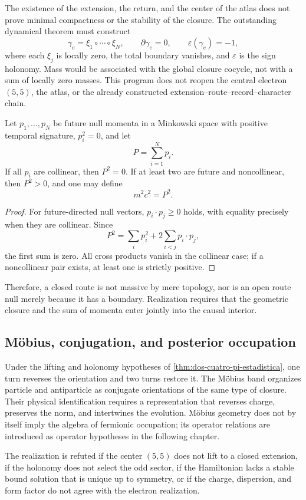 The existence of the extension, the return, and the center of the atlas does not prove
minimal compactness or the stability of the closure. The outstanding dynamical
theorem must construct
\[
 \gamma_e=\xi_1\circ\cdots\circ\xi_N,
 \qquad
 \partial\gamma_e=0,
 \qquad
 \varepsilon(\gamma_e)=-1,
\]
where each \(\xi_j\) is locally zero, the total boundary vanishes, and
\(\varepsilon\) is the sign holonomy. Mass would be associated with the global
closure cocycle, not with a sum of locally zero masses. This program does not
reopen the central electron \((5,5)\), the atlas, or the already constructed
extension--route--record--character chain.

\begin{proposition}
\label{prop:cierre-nulos-interior-causal}
Let \(p_1,\ldots,p_N\) be future null momenta in a Minkowski space with
positive temporal signature, \(p_i^2=0\), and let
\[
 P=\sum_{i=1}^{N}p_i.
\]
If all \(p_i\) are collinear, then \(P^2=0\). If at least two are
future and noncollinear, then \(P^2>0\), and one may define
\[
 m^2c^2=P^2.
\]
\end{proposition}

\begin{proof}
For future-directed null vectors,
\(p_i\cdot p_j\geq0\) holds, with equality precisely when they are collinear.
Since
\[
 P^2=\sum_i p_i^2+2\sum_{i<j}p_i\cdot p_j,
\]
the first sum is zero. All cross products vanish in the
collinear case; if a noncollinear pair exists, at least one is strictly
positive.
\end{proof}

Therefore, a closed route is not massive by mere topology, nor is an
open route null merely because it has a boundary. Realization requires that
the geometric closure and the sum of momenta enter jointly into the
causal interior.

\subsection{Möbius, conjugation, and posterior occupation}

Under the lifting and holonomy hypotheses of \cref{thm:dos-cuatro-pi-estadistica}, one turn reverses the orientation and two turns restore it. The Möbius band organizes particle and antiparticle as conjugate orientations of the same type of closure. Their physical identification requires a representation that reverses charge, preserves the norm, and intertwines the evolution. Möbius geometry does not by itself imply the algebra of fermionic occupation; its operator relations are introduced as operator hypotheses in the following chapter.

\begin{criterion}
\label{crit:cierre-electronico}
The realization is refuted if the center \((5,5)\) does not lift to a
closed extension, if the holonomy does not select the odd sector, if the
Hamiltonian lacks a stable bound solution that is unique up to symmetry, or
if the charge, dispersion, and form factor do not agree with the electron
realization.
\end{criterion}
